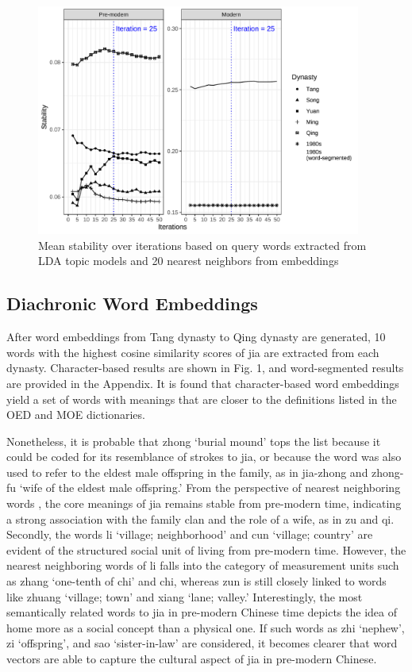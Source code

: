 \begin{figure}[H]
  \centering
  \includegraphics[width=0.95\textwidth,keepaspectratio]{figures_new/bootstrap_for_stability/stability.pdf}
  \caption{Mean stability over iterations based on query words extracted from LDA topic models and 20 nearest neighbors from  embeddings}
\end{figure}

\subsection{Diachronic Word Embeddings}
After word embeddings from Tang dynasty to Qing dynasty are generated, 10 words with the highest cosine similarity scores of jia are extracted from each dynasty. Character-based results are shown in Fig. 1, and word-segmented results are provided in the Appendix. It is found that character-based word embeddings yield a set of words with meanings that are closer to the definitions listed in the OED and MOE dictionaries.

Nonetheless, it is probable that zhong `burial mound' tops the list because it could be coded for its resemblance of strokes to jia, or because the word was also used to refer to the eldest male offspring in the family, as in jia-zhong and zhong-fu `wife of the eldest male offspring.' From the perspective of nearest neighboring words \parencite{hamilton2016cultural}, the core meanings of jia remains stable from pre-modern time, indicating a strong association with the family clan and the role of a wife, as in zu and qi. Secondly, the words li `village; neighborhood' and cun `village; country' are evident of the structured social unit of living from pre-modern time. However, the nearest neighboring words of li falls into the category of measurement units such as zhang `one-tenth of chi' and chi, whereas zun is still closely linked to words like zhuang `village; town' and xiang `lane; valley.' Interestingly, the most semantically related words to jia in pre-modern Chinese time depicts the idea of home more as a social concept than a physical one. If such words as zhi `nephew', zi `offspring', and sao `sister-in-law' are considered, it becomes clearer that word vectors are able to capture the cultural aspect of jia in pre-modern Chinese. 


